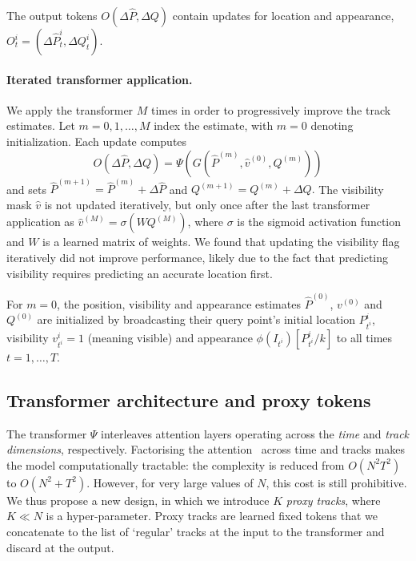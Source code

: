 The output tokens $O(\Delta \hat P, \Delta Q)$ contain updates for location and appearance, \ie
$
O^i_t =
(
    \Delta \hat P^{i}_t,
    \Delta Q^{i}_t
).
$

\paragraph{Iterated transformer application.}%
\label{sec:updates}

We apply the transformer $M$ times in order to progressively improve the track estimates.
Let $m=0,1,\dots,M$ index the estimate, with $m=0$ denoting initialization.
Each update computes
$$
  O(\Delta \hat P, \Delta Q)
  = \Psi(G(
    \hat P^{(m)}, \hat v^{(0)}, Q^{(m)}
  ))
$$
and sets
$
\hat P^{(m+1)} = \hat P^{(m)} + \Delta \hat P
$
and
$
Q^{(m+1)} = Q^{(m)} + \Delta Q.
$
The visibility mask $\hat v$ is not updated iteratively, but only once after the last transformer application as
$
 \hat v^{(M)} = \sigma(W Q^{(M)})
$,
where $\sigma$ is the sigmoid activation function and $W$ is a learned matrix of weights.
We found that updating the visibility flag iteratively did not improve performance, likely due to the fact that predicting visibility requires predicting an accurate location first.

For $m=0$, the position, visibility and appearance estimates $\hat P^{(0)}$, $v^{(0)}$ and $Q^{(0)}$ are initialized by broadcasting their query point's initial location $P^i_{t^i}$, visibility $v^i_{t^i}=1$ (meaning visible) and appearance $\phi(I_{t^i})[P^i_{t^i}/k]$ to all times $t=1,\dots,T$.



\subsection{Transformer architecture and proxy tokens}%
\label{s:virtual_tracks}
The transformer $\Psi$ interleaves attention layers operating across the \emph{time} and \emph{track dimensions}, respectively.
Factorising the attention~\cite{gberta_2021_ICML} across time and tracks makes the model computationally tractable:
the complexity is reduced from $O(N^2T^2)$ to $O(N^2+T^2)$.
However, for very large values of $N$, this cost is still prohibitive.
We thus propose a new design, in which we introduce $K$ \emph{proxy tracks}, where $K \ll N$ is a hyper-parameter.
Proxy tracks are learned fixed tokens that we concatenate to the list of `regular' tracks at the input to the transformer and discard at the output.


